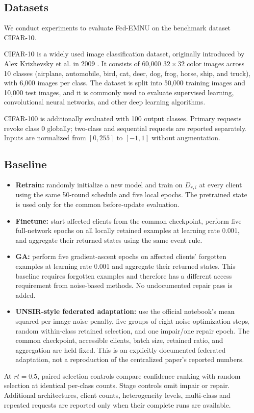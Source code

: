 \documentclass[software,article,submit,moreauthors]{Definitions/mdpi}
\begin{document}
\subsection{Datasets}
\label{sec:settings}


We conduct experiments to evaluate Fed-EMNU on the benchmark dataset CIFAR-10.

CIFAR-10 is a widely used image classification dataset, originally introduced by
Alex Krizhevsky et al. in 2009 \cite{ref19}. It consists of 60,000
$32\times32$ color images across 10 classes (airplane, automobile, bird, cat,
deer, dog, frog, horse, ship, and truck), with 6,000 images per class. The
dataset is split into 50,000 training images and 10,000 test images, and it is
commonly used to evaluate supervised learning, convolutional neural networks,
and other deep learning algorithms.


CIFAR-100 is additionally evaluated with 100 output classes. Primary requests
revoke class 0 globally; two-class and sequential requests are reported
separately. Inputs are normalized from $[0,255]$ to $[-1,1]$ without augmentation.

\subsection{Baseline}
\label{sec:baselines}
\begin{itemize}
\item \textbf{Retrain:} randomly initialize a new model and train on
$D_{r,i}$ at every client using the same 50-round schedule and five local epochs.
The pretrained state is used only for the common before-update evaluation.
\item \textbf{Finetune:} start affected clients from the common checkpoint,
perform five full-network epochs on all locally retained examples at learning
rate 0.001, and aggregate their returned states using the same event rule.
\item \textbf{GA:} perform five gradient-ascent epochs on affected clients'
forgotten examples at learning rate 0.001 and aggregate their returned states.
This baseline requires forgotten examples and therefore has a different access
requirement from noise-based methods. No undocumented repair pass is added.
\item \textbf{UNSIR-style federated adaptation:} use the official notebook's
mean squared per-image noise penalty, five groups of eight noise-optimization
steps, random within-class retained selection, and one impair/one repair epoch.
The common checkpoint, accessible clients, batch size, retained ratio, and
aggregation are held fixed. This is an explicitly documented federated
adaptation, not a reproduction of the centralized paper's reported numbers.
\end{itemize}
At $rt=0.5$, paired selection controls compare confidence ranking with random
selection at identical per-class counts. Stage controls omit impair or repair. Additional
architectures, client counts, heterogeneity levels, multi-class and repeated
requests are reported only when their complete runs are available.
\end{document}
